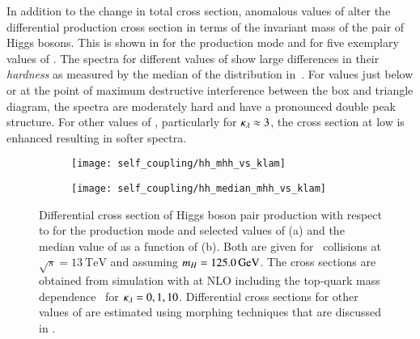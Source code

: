 In addition to the change in total cross section, anomalous values of \klambda
alter the differential \HH production cross section in terms of the invariant
mass of the pair of Higgs bosons. This is shown in  for
the \ggF production mode and for five exemplary values of \klambda. The \mHH
spectra for different values of \klambda show large differences in their
\emph{hardness} as measured by the median of the \mHH distribution
in~. For \klambda values just below or at the point of
maximum destructive interference between the box and triangle diagram, the \mHH
spectra are moderately hard and have a pronounced double peak structure. For
other values of \klambda, particularly for $\kappa_{\lambda} \approx 3$, the cross
section at low \mHH is enhanced resulting in softer \mHH spectra.

\begin{figure}[htbp]
  \begin{subfigure}[t]{0.485\textwidth}
    \texttt{[image: self\_coupling/hh\_mhh\_vs\_klam]}
    \subcaption{%
    }%
    \label{fig:hh_xsec_mhh}
  \end{subfigure}\hfill%
  \begin{subfigure}[t]{0.485\textwidth}
    \texttt{[image: self\_coupling/hh\_median\_mhh\_vs\_klam]}
    \subcaption{%
    }%
    \label{fig:hh_median_mhh}
  \end{subfigure}

  \caption[Differential cross section of Higgs boson pair production with
  respect to \mHH for the \ggF production mode and selected values of \klambda
  and the median value of \mHH as a function of \klambda.]{Differential cross
    section of Higgs boson pair production with respect to \mHH for the \ggF
    production mode and selected values of \klambda (a) and the median value of
    \mHH as a function of \klambda (b). Both are given for \pp~collisions at
    $\sqrt{s} = \SI{13}{\TeV}$ and assuming $m_{H} = \SI{125.0}{\ensuremath{\text{GeV}}}$. The cross
    sections are obtained from simulation with \POWHEGBOX[v2] at NLO including
    the top-quark mass dependence~\cite{Heinrich:2019bkc,Heinrich:2020ckp} for
    $\kappa_{\lambda} = 0, 1, 10$. Differential cross sections for other values of
    \klambda are estimated using morphing techniques that are discussed in
    .}
  \label{fig:xsec_median_mhh}
\end{figure}

